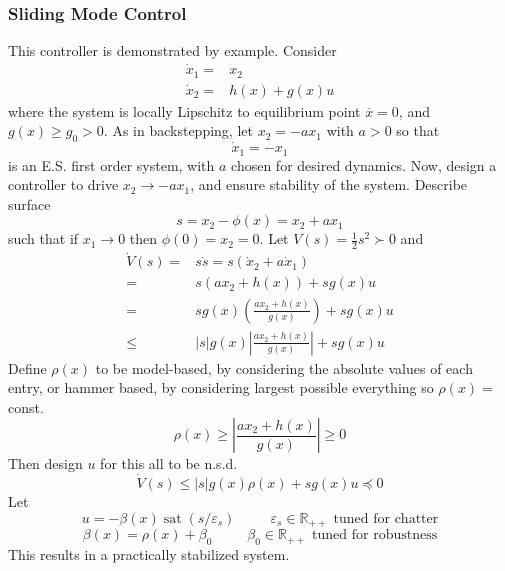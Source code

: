 \documentclass[twocolumn]{article}    %
\begin{document}
\subsubsection*{Sliding Mode Control}
This controller is demonstrated by example. Consider
\begin{align*}
    \dot{x}_1 =& x_2\\ \dot{x}_2=& h(x) + g(x) u
\end{align*}
where the system is locally Lipschitz to equilibrium point \(\overline{x} =0\), and \(g(x) \geq g_0>0\). As in backstepping, let \(x_2 = -ax_1\) with \(a>0\) so that 
\begin{equation*}
    \dot{x}_1 = -x_1 
\end{equation*}
is an E.S. first order system, with \(a\) chosen for desired dynamics. Now, design a controller to drive \(x_2 \to  -ax_1\), and ensure stability of the system. Describe surface
\begin{equation*}
    s   = x_2 -\phi(x)= x_2 + ax_1
\end{equation*}
such that if \(x_1 \to0\) then \(\phi(0) = x_2 =0\). Let \(V(s) = \frac{1}{2}s^2 \succ 0\) and 
\begin{align*}
    \dot{V}(s) =& s\dot{s} = s(\dot{x}_2+a\dot{x}_1)\\
    =& s(ax_2 + h(x)) + sg(x)u\\
    =& s g(x) \left(\frac{ax_2 + h(x)}{g(x)}\right) + sg(x)u\\
    \leq& |s|g(x) \left| \frac{ax_2 + h(x)}{g(x)} \right| + sg(x)u
\end{align*}
Define \(\rho(x)\) to be model-based, by considering the absolute values of each entry, or hammer based, by considering largest possible everything so \(\rho(x) =\) const.
\begin{equation*}
    \rho(x) \geq \left| \frac{ax_2 + h(x)}{g(x)} \right| \geq 0
\end{equation*}
Then design \(u\) for this all to be n.s.d.
\begin{equation*}
    \dot{V}(s) \leq |s|g(x) \rho(x) + sg(x)u \preceq 0
\end{equation*}
Let
\begin{equation*}
    u = -\beta(x) \operatorname{sat}(s/\varepsilon_s) \hspace{30pt} \varepsilon_s \in \mathds{R}_{++} \text{ tuned for chatter}
\end{equation*}
\begin{equation*}
    \beta(x) = \rho(x) + \beta_0 \hspace{30pt} \beta_0 \in \mathds{R}_{++} \text{ tuned for robustness}
\end{equation*}
This results in a practically stabilized system.
\end{document}
